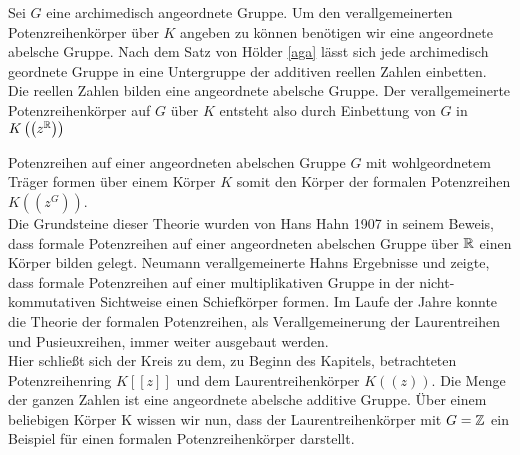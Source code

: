 %
%
%
%
\begin{bsp}
Sei $G$ eine archimedisch angeordnete Gruppe. Um den verallgemeinerten Potenzreihenkörper über $K$ angeben zu können benötigen wir eine angeordnete abelsche Gruppe. Nach dem Satz von Hölder \ref{aga} lässt sich jede archimedisch geordnete Gruppe in eine Untergruppe der additiven reellen Zahlen einbetten.
Die reellen Zahlen bilden eine angeordnete abelsche Gruppe. Der verallgemeinerte Potenzreihenkörper auf $G$ über $K$ entsteht also durch Einbettung von $G$ in $K\left(\left(z^{\mathbb{R}}\right)\right)$
\end{bsp}
%
%
% 
%
%
%
%
Potenzreihen auf einer angeordneten abelschen Gruppe $G$ mit wohlgeordnetem Träger formen über einem Körper $K$ somit den Körper der formalen Potenzreihen $K\left(\left(z^{G}\right)\right)$. \\
Die Grundsteine dieser Theorie wurden von Hans Hahn 1907 in seinem Beweis, dass formale Potenzreihen auf einer angeordneten abelschen Gruppe über $\mathbb{R}$ einen Körper bilden gelegt. Neumann verallgemeinerte Hahns Ergebnisse und zeigte, dass formale Potenzreihen auf einer multiplikativen Gruppe in der nicht-kommutativen Sichtweise einen Schiefkörper formen. Im Laufe der Jahre konnte die Theorie der formalen Potenzreihen, als Verallgemeinerung der Laurentreihen und Pusieuxreihen, immer weiter ausgebaut werden. \\
Hier schließt sich der Kreis zu dem, zu Beginn des Kapitels, betrachteten Potenzreihenring $K[[z]]$ und dem Laurentreihenkörper $K((z))$. Die Menge der ganzen Zahlen ist eine angeordnete abelsche additive Gruppe. Über einem beliebigen Körper K wissen wir nun, dass der Laurentreihenkörper mit $G = \mathbb{Z}$ ein Beispiel für einen formalen Potenzreihenkörper darstellt.
%
%
%
